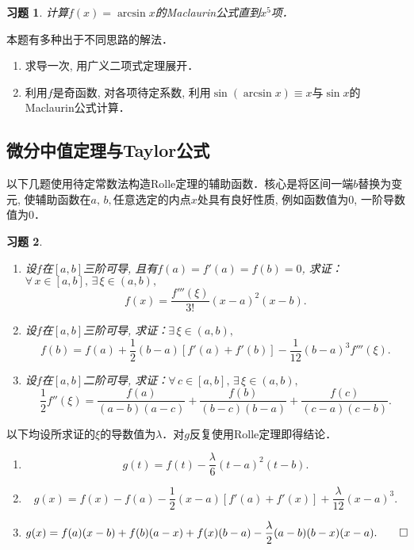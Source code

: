 \documentclass[11pt,a4paper]{ctexart}
\makeatletter
\theoremstyle{thmseries} %
\theoremstyle{exerseries}
\newtheorem{exer}{习题}[section]
\renewenvironment{proof}[1][\proofname]{\par
  \pushQED{\qed}%
  \normalfont \topsep6\p@\@plus6\p@\relax
  \trivlist
  \item[\hskip\labelsep
        \itshape
    #1\@addpunct{}]\ignorespaces
}{%
  \popQED\endtrivlist\@endpefalse
}
\newenvironment{sol}{\begin{proof}[\bfseries\upshape 解\quad]}{\end{proof}}
\newenvironment{pf}{\begin{proof}[\bfseries\upshape 证\quad]}{\end{proof}}
\newcommand{\sbra}[1]{\mathopen{}\left[#1\right]}
\makeatother
\begin{document}
\begin{exer}
	计算$f(x)=\arcsin x$的Maclaurin公式直到$x^5$项．
\end{exer}
\begin{sol}
	本题有多种出于不同思路的解法．
	\begin{enumerate}
		\item 求导一次, 用广义二项式定理展开．
		\item 利用$f$是奇函数, 对各项待定系数, 利用$\sin(\arcsin x)\equiv x$与$\sin x$的Maclaurin公式计算．\qedhere
	\end{enumerate}
\end{sol}


\subsection{微分中值定理与Taylor公式}
以下几题使用待定常数法构造Rolle定理的辅助函数．核心是将区间一端$b$替换为变元, 使辅助函数在$a,\,b,$任意选定的内点$x$处具有良好性质, 例如函数值为0, 一阶导数值为0．
\begin{exer}
	\phantom{text}
	\begin{enumerate}
		\item 设$f$在$[a,b]$三阶可导, 且有$f(a)=f'(a)=f(b)=0$, 求证：$\forall\,x\in[a,b],\,\exists\,\xi\in(a,b),$
		\[f(x)=\frac{f'''(\xi)}{3!}(x-a)^2(x-b).\]
		\item 设$f$在$[a,b]$三阶可导, 求证：$\exists\,\xi\in(a,b),$
		\[f(b)=f(a)+\frac{1}{2}(b-a)[f'(a)+f'(b)]-\frac{1}{12}(b-a)^3f'''(\xi).\]
		\item 设$f$在$[a,b]$二阶可导, 求证：$\forall\,c\in[a,b],\,\exists\,\xi\in(a,b),$
		\[\frac{1}{2}f''(\xi)=\frac{f(a)}{(a-b)(a-c)}+\frac{f(b)}{(b-c)(b-a)}+\frac{f(c)}{(c-a)(c-b)}.\]
	\end{enumerate}
\end{exer}
\begin{pf}
	以下均设所求证的$\xi$的导数值为$\lambda$．对$g$反复使用Rolle定理即得结论．
	\begin{enumerate}
		\item \[g(t)=f(t)-\frac{\lambda}{6}(t-a)^2(t-b).\]
		\item \[g(x)=f(x)-f(a)-\frac{1}{2}(x-a)\sbra{f'(a)+f'(x)}+\frac{\lambda}{12}(x-a)^3.\]
		\item \[g(x)=f(a)(x-b)+f(b)(a-x)+f(x)(b-a)-\frac{\lambda}{2}(a-b)(b-x)(x-a).\qedhere\]
	\end{enumerate}
\end{pf}
\end{document}
